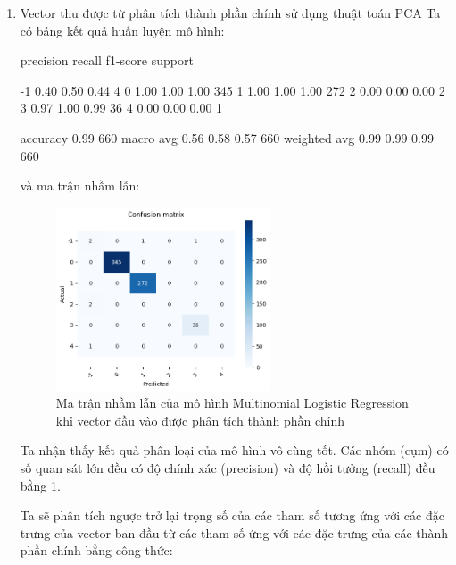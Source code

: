 \begin{enumerate}[label=(\alph*)]
    \item Vector thu được từ phân tích thành phần chính sử dụng thuật toán PCA 
    Ta có bảng kết quả huấn luyện mô hình:

    \begin{python}
        precision    recall  f1-score   support

        -1       0.40      0.50      0.44         4
         0       1.00      1.00      1.00       345
         1       1.00      1.00      1.00       272
         2       0.00      0.00      0.00         2
         3       0.97      1.00      0.99        36
         4       0.00      0.00      0.00         1

  accuracy                           0.99       660
 macro avg       0.56      0.58      0.57       660
weighted avg       0.99      0.99      0.99       660

    \end{python}

    và ma trận nhầm lẫn:

    \begin{figure}[H]
        \centering
        \includegraphics[width=0.6\textwidth]{figures/Thanh/Data_Analysis/Non_null_confusion_matrix_Logistic_PCA_features.png}
        \caption{Ma trận nhầm lẫn của mô hình Multinomial Logistic Regression khi vector đầu vào được phân tích thành phần chính}
        \label{fig:Non_null_confusion_matrix_Logistic_PCA_features}
    \end{figure}

    Ta nhận thấy kết quả phân loại của mô hình vô cùng tốt.
    Các nhóm (cụm) có số quan sát lớn đều có độ chính xác (precision) và độ hồi tưởng (recall) đều bằng 1.

    Ta sẽ phân tích ngược trở lại trọng số của các tham số tương ứng với các đặc trưng của vector ban đầu từ các tham số ứng với các đặc trưng của các thành phần chính bằng công thức:


\end{enumerate}
